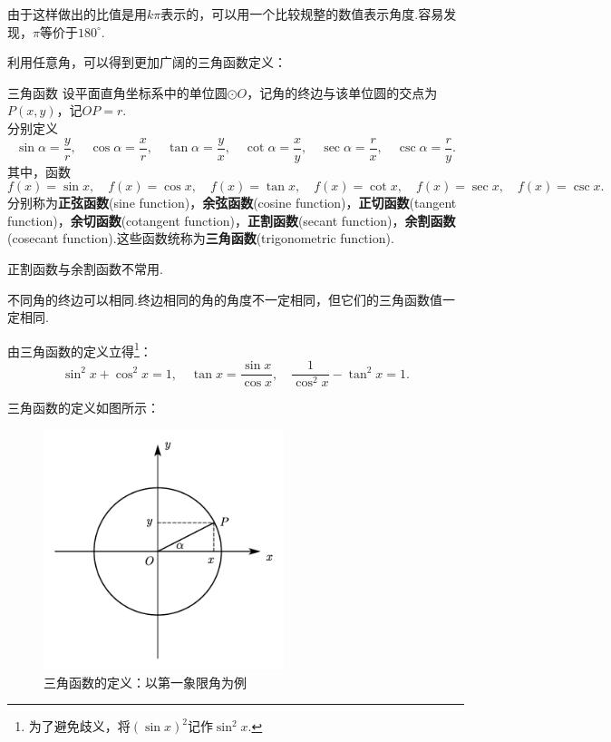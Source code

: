 \documentclass[lang=cn, zihao=5]{elegantbook}
\begin{document}
由于这样做出的比值是用$k \pi$表示的，可以用一个比较规整的数值表示角度.容易发现，$\pi$等价于$180^{\circ}$.

利用任意角，可以得到更加广阔的三角函数定义：

\begin{definition}{三角函数} %
    设平面直角坐标系中的单位圆$\odot O$，记角的终边与该单位圆的交点为$P(x,y)$，记$OP=r$.\\
    分别定义$$\sin{\alpha}=\frac{y}{r}, \quad \cos{\alpha}=\frac{x}{r}, \quad \tan{\alpha}=\frac{y}{x}, \quad \cot{\alpha}=\frac{x}{y}, \quad \sec \alpha = \frac{r}{x}, \quad \csc \alpha = \frac{r}{y}.$$
    其中，函数$$f(x)=\sin{x}, \quad f(x)=\cos{x}, \quad f(x)=\tan{x}, \quad f(x)=\cot{x}, \quad f(x)=\sec x, \quad f(x)=\csc x.$$
    分别称为\textbf{正弦函数}(sine function)，\textbf{余弦函数}(cosine function)，\textbf{正切函数}(tangent function)，\textbf{余切函数}(cotangent function)，\textbf{正割函数}(secant function)，\textbf{余割函数}(cosecant function).这些函数统称为\textbf{三角函数}(trigonometric function).
\end{definition}
\begin{remark}
    正割函数与余割函数不常用.
\end{remark}
\begin{remark}
    不同角的终边可以相同.终边相同的角的角度不一定相同，但它们的三角函数值一定相同.
\end{remark}

由三角函数的定义立得\footnote{为了避免歧义，将$(\sin x)^2$记作$\sin ^2 x$.}：$$\sin ^2 x + \cos ^2 x = 1,\quad \tan x = \frac{\sin x}{\cos x},\quad \frac{1}{\cos ^2 x} - \tan ^2 x =1.$$

三角函数的定义如图所示：

\begin{figure}[H]
	\centering
	\includegraphics[width=7cm]{attachment/20230622 copy 2.pdf}
	\caption{三角函数的定义：以第一象限角为例}
\end{figure}
\end{document}
